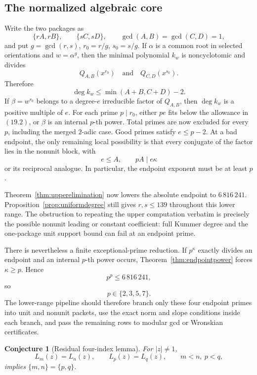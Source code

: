 \documentclass[11pt]{article}
\newtheorem{conjecture}[theorem]{Conjecture}
\theoremstyle{definition}
\begin{document}
\subsection{The normalized algebraic core}

Write the two packages as
\[
 \{rA,rB\},\qquad \{sC,sD\},
 \qquad \gcd(A,B)=\gcd(C,D)=1,
\]
and put \(g=\gcd(r,s)\), \(r_0=r/g\), \(s_0=s/g\).  If \(\alpha\) is
a common root in selected orientations and \(w=\alpha^g\), then the minimal
polynomial \(k_w\) is noncyclotomic and divides
\[
 Q_{A,B}(x^{r_0})
 \quad\text{and}\quad
 Q_{C,D}(x^{s_0}).
\]
Therefore
\begin{equation}
 \deg k_w\leq\min(A+B,C+D)-2.
 \tag{19.2}
\end{equation}
If \(\beta=w^{r_0}\) belongs to a degree-\(e\) irreducible factor of
\(Q_{A,B}\), then \(\deg k_w\) is a positive multiple of \(e\).  For
each prime \(p\mid r_0\), either \(pe\) fits below the allowance in
\((19.2)\), or \(\beta\) is an internal \(p\)-th power.  Total primes are
now excluded for every \(p\), including the merged \(2\)-adic case.
Good primes satisfy \(e\leq p-2\).  At a bad endpoint, the only remaining
local possibility is that every conjugate of the factor lies in the nonunit
block, with
\[
 e\leq A,\qquad pA\mid e\kappa
\]
or its reciprocal analogue.  In particular, the endpoint exponent must be
at least \(p\).

Theorem~\ref{thm:upperelimination} now lowers the absolute endpoint to
\(6\,816\,241\).  Proposition~\ref{prop:uniformdegree} still gives
\(r,s\leq139\) throughout this lower range.  The obstruction to repeating
the upper computation verbatim is precisely the possible nonunit leading or
constant coefficient: full Kummer degree and the one-package unit support
bound can fail at an endpoint prime.

There is nevertheless a finite exceptional-prime reduction.  If
\(p^\kappa\) exactly divides an endpoint and an internal \(p\)-th power
occurs, Theorem~\ref{thm:endpointpower} forces \(\kappa\geq p\).  Hence
\[
 p^p\leq6\,816\,241,
\]
so
\[
 p\in\{2,3,5,7\}.
\]
The lower-range pipeline should therefore branch only these four endpoint
primes into unit and nonunit packets, use the exact norm and slope conditions
inside each branch, and pass the remaining rows to modular gcd or Wronskian
certificates.

\begin{conjecture}[Residual four-index lemma]\label{conj:fourindex}
For \(|z|\neq1\),
\[
 L_m(z)=L_n(z),\qquad L_p(z)=L_q(z),
 \qquad m<n,\ p<q,
\]
implies \(\{m,n\}=\{p,q\}\).
\end{conjecture}
\end{document}
